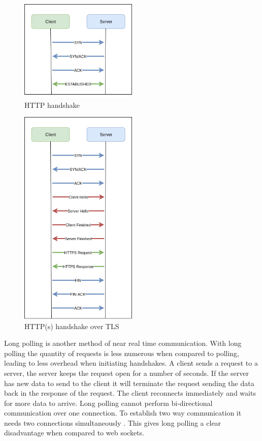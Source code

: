 \begin{figure}[ht]
  \centering
    \includegraphics[width=0.5\textwidth]{figures/http-handshake.png}
    \caption{HTTP handshake}
    \label{fig:http-handshake}
\end{figure}

\begin{figure}[ht]
  \centering
    \includegraphics[width=0.5\textwidth]{figures/https-handshake.png}
    \caption{HTTP(s) handshake over TLS}
    \label{fig:https-handshake}
\end{figure}

Long polling is another method of near real time communication. With long polling the quantity of requests is less numerous when compared to polling, leading to less overhead when initiating handshakes. A client sends a request to a server, the server keeps the request open for a number of seconds. If the server has new data to send to the client it will terminate the request sending the data back in the response of the request. The client reconnects immediately and waits for more data to arrive. Long polling cannot perform bi-directional communication over one connection. To establish two way communication it needs two connections simultaneously \cite{6364271}. This gives long polling a clear disadvantage when compared to web sockets.

